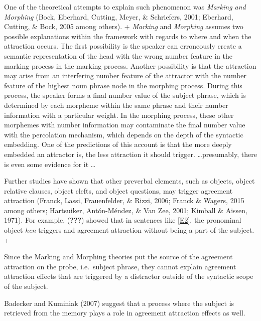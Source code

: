 \documentclass[doc]{apa6}
\begin{document}
One of the theoretical attempts to explain such phenomenon was \emph{Marking and Morphing} (Bock, Eberhard, Cutting, Meyer, \& Schriefers, 2001; Eberhard, Cutting, \& Bock, 2005 among others).
+
\emph{Marking} and \emph{Morphing} assumes two possible explanations within the framework with regards to where and when the attraction occurs. The first possibility is the speaker can erroneously create a semantic representation of the head with the wrong number feature in the marking process in the marking process. Another possibility is that the attraction may arise from an interfering number feature of the attractor with the number feature of the highest noun phrase node in the morphing process. During this process, the speaker forms a final number value of the subject phrase, which is determined by each morpheme within the same phrase and their number information with a particular weight. In the morphing process, these other morphemes with number information may contaminate the final number value with the percolation mechanism, which depends on the depth of the syntactic embedding. One of the predictions of this account is that the more deeply embedded an attractor is, the less attraction it should trigger. \ldots presumably, there is even some evidence for it \ldots 

Further studies have shown that other preverbal elements, such as objects, object relative clauses, object clefts, and object questions, may trigger agreement attraction (Franck, Lassi, Frauenfelder, \& Rizzi, 2006; Franck \& Wagers, 2015 among others; Hartsuiker, Antón-Méndez, \& Van Zee, 2001; Kimball \& Aissen, 1971). For example, ({\textbf{???}}) showed that in sentences like \autoref{E2}, the pronominal object \emph{hen} triggers and agreement attraction without being a part of the subject.
+

\begin{exe}
\label{E2}
\end{exe}

Since the Marking and Morphing theories put the source of the agreement attraction on the probe, i.e.~subject phrase, they cannot explain agreement attraction effects that are triggered by a distractor outside of the syntactic scope of the subject.

Badecker and Kuminiak (2007) suggest that a process where the subject is retrieved from the memory plays a role in agreement attraction effects as well.
\end{document}

